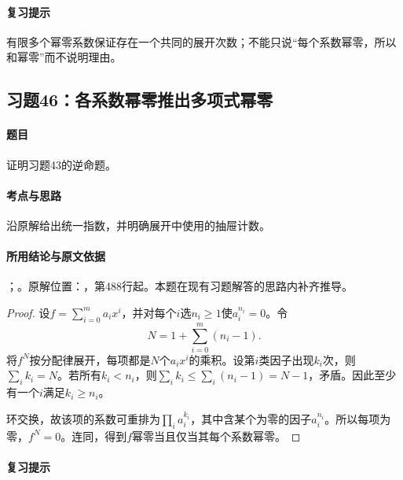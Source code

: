 \paragraph{复习提示}

有限多个幂零系数保证存在一个共同的展开次数；不能只说“每个系数幂零，所以和幂零”而不说明理由。



\subsection{习题46：各系数幂零推出多项式幂零}

\label{ex:3:46}

\paragraph{题目}

证明习题43的逆命题。

\paragraph{考点与思路}

沿原解给出统一指数，并明确展开中使用的抽屉计数。

\paragraph{所用结论与原文依据}

；。原解位置：，第488行起。本题在现有习题解答的思路内补齐推导。


\begin{proof}

设$f=\sum_{i=0}^m a_ix^i$，并对每个$i$选$n_i\ge1$使$a_i^{n_i}=0$。令
\[
N=1+\sum_{i=0}^m(n_i-1).
\]
将$f^N$按分配律展开，每项都是$N$个$a_ix^i$的乘积。设第$i$类因子出现$k_i$次，则$\sum_i k_i=N$。若所有$k_i<n_i$，则$\sum_i k_i\le\sum_i(n_i-1)=N-1$，矛盾。因此至少有一个$i$满足$k_i\ge n_i$。

环交换，故该项的系数可重排为$\prod_i a_i^{k_i}$，其中含某个为零的因子$a_i^{n_i}$。所以每项为零，$f^N=0$。连同，得到$f$幂零当且仅当其每个系数幂零。

\end{proof}

\paragraph{复习提示}

